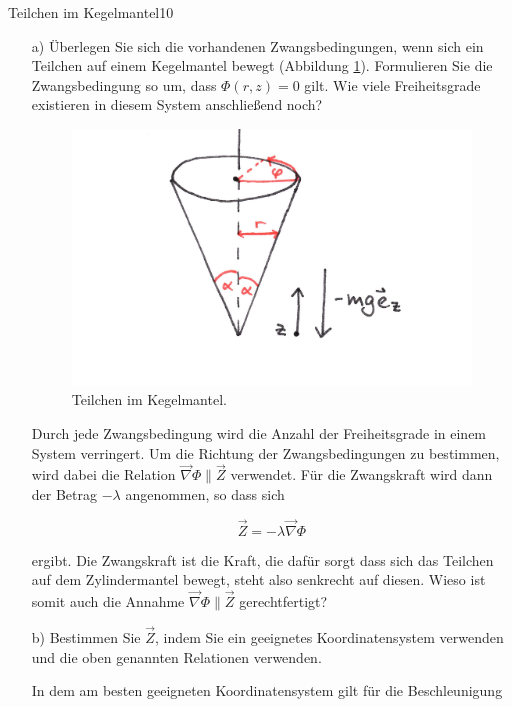 \begin{exercise}{Teilchen im Kegelmantel}{10}


  \begin{enumerate}
    \item[a)] Überlegen Sie sich die vorhandenen Zwangsbedingungen, wenn sich ein
    Teilchen auf einem Kegelmantel bewegt (Abbildung \ref{fig:TiK}).
    Formulieren Sie die Zwangsbedingung
    so um, dass $\Phi(r,z) = 0$ gilt. Wie viele Freiheitsgrade existieren
    in diesem System anschlie\ss{}end noch?

    \FloatBarrier
    \begin{figure}
      \centering
      \includegraphics[width = 7 cm]{Kegel.jpg}
      \caption{Teilchen im Kegelmantel.}
      \label{fig:TiK}
    \end{figure}

    \item[\bullet]Durch jede Zwangsbedingung wird die Anzahl der Freiheitsgrade in einem System
    verringert. Um die Richtung der Zwangsbedingungen zu bestimmen, wird dabei
    die Relation $ \vec{\nabla} \Phi \parallel \vec{Z}$ verwendet. Für die
    Zwangskraft wird dann der Betrag $-\lambda$ angenommen, so dass sich

    \begin{equation}
      \vec{Z} = - \lambda \vec{\nabla} \Phi
    \end{equation}

    ergibt. Die Zwangskraft ist die Kraft, die dafür sorgt dass sich das Teilchen
    auf dem Zylindermantel bewegt, steht also senkrecht auf diesen. Wieso ist
    somit auch die Annahme $ \vec{\nabla} \Phi \parallel \vec{Z}$ gerechtfertigt?

    \item[b)] Bestimmen Sie $\vec{Z}$, indem Sie ein geeignetes Koordinatensystem
    verwenden und die oben genannten Relationen verwenden.

    \item[\bullet]In dem am besten geeigneten Koordinatensystem gilt für die Beschleunigung


\end{enumerate}
\end{exercise}
